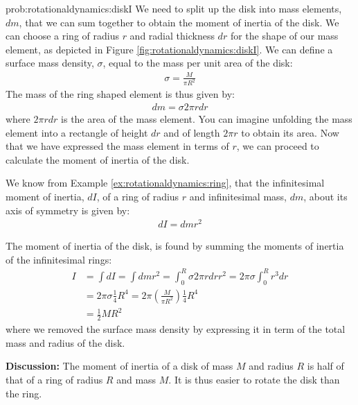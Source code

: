 \begin{solution}{prob:rotationaldynamics:diskI}\label{soln:rotationaldynamics:diskI}
We need to split up the disk into mass elements, $dm$, that we can sum together to obtain the moment of inertia of the disk. We can choose a ring of radius $r$ and radial thickness $dr$ for the shape of our mass element, as depicted in Figure \ref{fig:rotationaldynamics:diskI}.
We can define a surface mass density, $\sigma$, equal to the mass per unit area of the disk:
\begin{align*}
\sigma = \frac{M}{\pi R^2}
\end{align*}
The mass of the ring shaped element is thus given by:
\begin{align*}
dm = \sigma 2\pi r dr
\end{align*}
where $2\pi r dr$ is the area of the mass element. You can imagine unfolding the mass element into a rectangle of height $dr$ and of length $2\pi r$ to obtain its area. Now that we have expressed the mass element in terms of $r$, we can proceed to calculate the moment of inertia of the disk.

We know from Example \ref{ex:rotationaldynamics:ring}, that the infinitesimal moment of inertia, $dI$, of a ring of radius $r$ and infinitesimal mass, $dm$, about its axis of symmetry is given by:
\begin{align*}
dI = dm r^2
\end{align*}

The moment of inertia of the disk, is found by summing the moments of inertia of the infinitesimal rings:
\begin{align*}
I &=\int dI = \int dm r^2 = \int_0^R \sigma 2\pi r dr r^2 =2\pi \sigma \int_0^R  r^3 dr \\
&=2 \pi \sigma \frac{1}{4}R^4 = 2\pi \left( \frac{M}{\pi R^2} \right) \frac{1}{4}R^4\\
&=\frac{1}{2}MR^2
\end{align*}
where we removed the surface mass density by expressing it in term of the total mass and radius of the disk. 

\textbf{Discussion:} The moment of inertia of a disk of mass $M$ and radius $R$ is half of that of a ring of radius $R$ and mass $M$. It is thus easier to rotate the disk than the ring. 
\end{solution}

